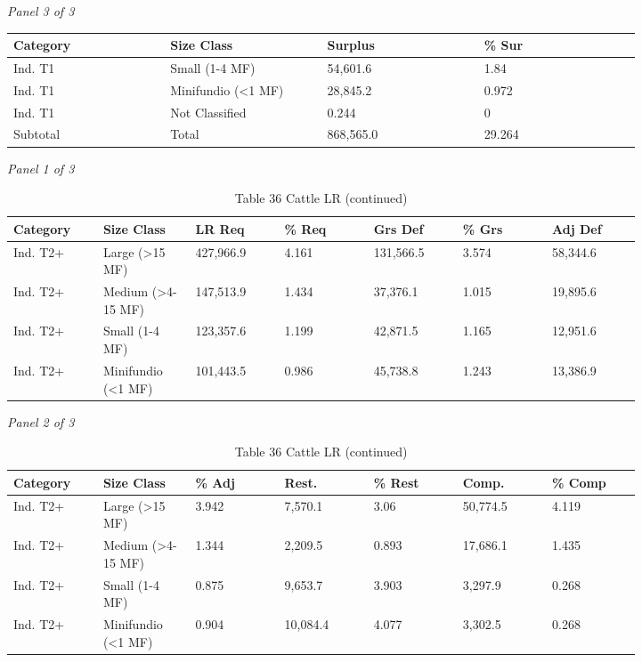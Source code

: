 \documentclass[12pt]{article}
\begin{document}
\begin{landscape}
\begin{table}[H]
\vspace{0.6em}

\textit{Panel 3 of 3}\\[2pt]
{\fontsize{12}{14}\selectfont
\setlength{\tabcolsep}{3pt}
\renewcommand{\arraystretch}{1.08}
\begin{tabular}{p{0.205\linewidth}p{0.205\linewidth}p{0.205\linewidth}p{0.205\linewidth}}
\toprule
Category & Size Class & Surplus & \% Sur \\
\midrule
Ind. T1 & Small (1-4 MF) & 54,601.6 & 1.84 \\
Ind. T1 & Minifundio (<1 MF) & 28,845.2 & 0.972 \\
Ind. T1 & Not Classified & 0.244 & 0 \\
Subtotal & Total & 868,565.0 & 29.264 \\
\bottomrule
\end{tabular}
}
\end{table}
\begin{table}[H]
\centering
\caption{Table 36 Cattle LR (continued)}
\textit{Panel 1 of 3}\\[2pt]
{\fontsize{12}{14}\selectfont
\setlength{\tabcolsep}{3pt}
\renewcommand{\arraystretch}{1.08}
\begin{tabular}{p{0.117\linewidth}p{0.117\linewidth}p{0.117\linewidth}p{0.117\linewidth}p{0.117\linewidth}p{0.117\linewidth}p{0.117\linewidth}}
\toprule
Category & Size Class & LR Req & \% Req & Grs Def & \% Grs & Adj Def \\
\midrule
Ind. T2+ & Large (>15 MF) & 427,966.9 & 4.161 & 131,566.5 & 3.574 & 58,344.6 \\
Ind. T2+ & Medium (>4-15 MF) & 147,513.9 & 1.434 & 37,376.1 & 1.015 & 19,895.6 \\
Ind. T2+ & Small (1-4 MF) & 123,357.6 & 1.199 & 42,871.5 & 1.165 & 12,951.6 \\
Ind. T2+ & Minifundio (<1 MF) & 101,443.5 & 0.986 & 45,738.8 & 1.243 & 13,386.9 \\
\bottomrule
\end{tabular}
}

\vspace{0.6em}

\textit{Panel 2 of 3}\\[2pt]
{\fontsize{12}{14}\selectfont
\setlength{\tabcolsep}{3pt}
\renewcommand{\arraystretch}{1.08}
\begin{tabular}{p{0.117\linewidth}p{0.117\linewidth}p{0.117\linewidth}p{0.117\linewidth}p{0.117\linewidth}p{0.117\linewidth}p{0.117\linewidth}}
\toprule
Category & Size Class & \% Adj & Rest. & \% Rest & Comp. & \% Comp \\
\midrule
Ind. T2+ & Large (>15 MF) & 3.942 & 7,570.1 & 3.06 & 50,774.5 & 4.119 \\
Ind. T2+ & Medium (>4-15 MF) & 1.344 & 2,209.5 & 0.893 & 17,686.1 & 1.435 \\
Ind. T2+ & Small (1-4 MF) & 0.875 & 9,653.7 & 3.903 & 3,297.9 & 0.268 \\
Ind. T2+ & Minifundio (<1 MF) & 0.904 & 10,084.4 & 4.077 & 3,302.5 & 0.268 \\
\bottomrule
\end{tabular}
}


\end{table}
\end{landscape}
\end{document}
